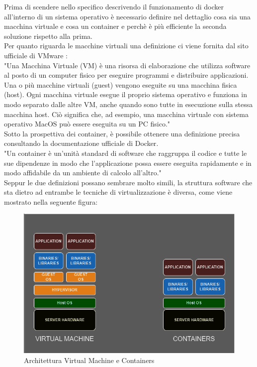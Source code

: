 Prima di scendere nello specifico descrivendo il funzionamento di docker all'interno di un sistema operativo è necessario definire nel dettaglio cosa sia una macchina virtuale e cosa un container e perchè è più efficiente la seconda soluzione rispetto alla prima.\\
Per quanto riguarda le macchine virtuali una definizione ci viene fornita dal sito ufficiale di VMware \cite{vmware}:\\
"Una Macchina Virtuale (VM) è una risorsa di elaborazione che utilizza software al posto di un computer fisico per eseguire programmi e distribuire applicazioni. Una o più macchine virtuali (guest) vengono eseguite su una macchina fisica (host). 
Ogni macchina virtuale esegue il proprio sistema operativo e funziona in modo separato dalle altre VM, anche quando sono tutte in esecuzione sulla stessa macchina host. Ciò significa che, ad esempio, una macchina virtuale con sistema operativo MacOS può essere eseguita su un PC fisico."\\

Sotto la prospettiva dei container, è possibile ottenere una definizione precisa consultando la documentazione ufficiale di Docker\cite{docker-container}.\\
"Un container è  un'unità standard di software che raggruppa il codice e tutte le sue dipendenze in modo che l'applicazione possa essere eseguita rapidamente e in modo affidabile da un ambiente di calcolo all'altro."\\

Seppur le due definizioni possano sembrare molto simili, la struttura software che sta dietro ad entrambe le tecniche di virtualizzazione è diversa, come viene mostrato nella seguente figura:\\


\begin{figure}[h]  %
    \centering
    \includegraphics[width=1\textwidth]{VMvsContainers.png}  %
    \caption{Architettura Virtual Machine e Containers}
    \label{fig:VMvsContainers}
\end{figure}
 
